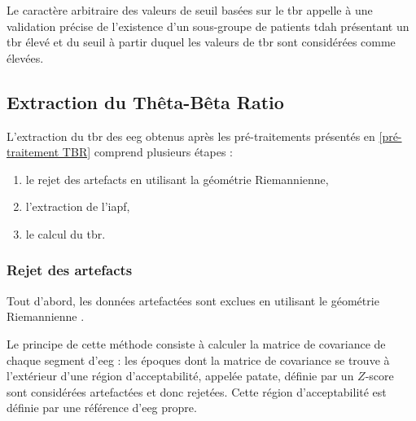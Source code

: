 Le caractère arbitraire des valeurs de seuil basées sur le \gls{tbr} appelle à une validation précise de l'existence d'un 
sous-groupe de patients \gls{tdah} présentant un \gls{tbr} élevé et du seuil à partir duquel les valeurs de \gls{tbr} sont considérées comme élevées.  
 
\subsection{Extraction du Thêta-Bêta Ratio} \label{extraction_tbr}
L'extraction du \gls{tbr} des \gls{eeg} obtenus après les pré-traitements présentés en \ref{pré-traitement TBR} comprend plusieurs étapes :
\begin{enumerate}
\item le rejet des artefacts en utilisant la géométrie Riemannienne,
\item l'extraction de l'\gls{iapf},
\item le calcul du \gls{tbr}.
\end{enumerate}

\subsubsection{Rejet des artefacts}
Tout d'abord, les données artefactées sont exclues en utilisant le géométrie Riemannienne \citep{Barachant2013, Barthelemy2019}. 

Le principe de cette méthode consiste à calculer la matrice de covariance de chaque segment d'\gls{eeg} : les époques dont la matrice de covariance se trouve à l'extérieur d'une région
d'acceptabilité, appelée patate, définie par un $Z$-score sont considérées artefactées et donc rejetées. Cette région d'acceptabilité est définie par une référence d'\gls{eeg} propre.

